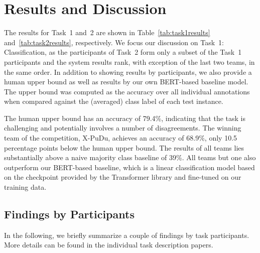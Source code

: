 \documentclass[11pt]{article}
\begin{document}


\section{Results and Discussion}
\label{sec:results}

The results for Task~1 and~2 are shown in Table~\ref{tab:task1results} and~\ref{tab:task2results}, respectively. We focus our discussion on Task~1: Classification, as the participants of Task~2 form only a subset of the Task~1 participants and the system results rank, with exception of the last two teams, in the same order. In addition to showing results by participants, we also provide a human upper bound as well as results by our own BERT-based baseline model. The upper bound was computed as the accuracy over all individual annotations when compared against the  (averaged) class label of each test instance.

The human upper bound has an accuracy of 79.4\%, indicating that the task is challenging and potentially involves a number of disagreements. The winning team of the competition, X-PuDu, achieves an accuracy of 68.9\%, only 10.5 percentage points below the human upper bound. The results of all teams lies substantially above a naive majority class baseline of 39\%. All teams but one also outperform our BERT-based baseline, which is a linear classification model based on the checkpoint provided by the Transformer library \cite{wolf-etal-2020-transformers} and fine-tuned on our training data.

\subsection{Findings by Participants}
\label{subsec:Findings}

In the following, we briefly summarize a couple of findings by task participants. More details can be found in the individual task description papers.
\end{document}
